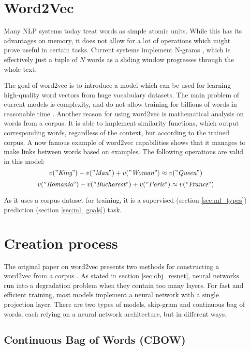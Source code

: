 \section{Word2Vec}
\label{sec:words_word2vec}

Many NLP systems today treat words as simple atomic units. While this has its advantages on memory, it does not allow for a lot of operations which might prove useful in certain tasks. Current systems implement N-grams \cite{word2vec}, which is effectively just a tuple of $N$ words as a sliding window progresses through the whole text.

The goal of word2vec is to introduce a model which can be used for learning high-quality word vectors from huge vocabulary datasets. The main problem of current models is complexity, and do not allow training for billions of words in reasonable time \cite{word2vec}. Another reason for using word2vec is mathematical analysis on words from a corpus. It is able to implement similarity functions, which output corresponding words, regardless of the context, but according to the trained corpus. A now famous example of word2vec capabilities shows that it manages to make links between words based on examples. The following operations are valid in this model:
$$ v("\textit{King}") - v("\textit{Man}") + v("\textit{Woman}") \approx v("\textit{Queen}") $$
$$ v("\textit{Romania}") - v("\textit{Bucharest}") + v("\textit{Paris}") \approx v("\textit{France}") $$

As it uses a corpus dataset for training, it is a supervised (section \ref{sec:ml_types}) prediction (section \ref{sec:ml_goals}) task.

\section{Creation process}
\label{sec:words_creation}

The original paper on word2vec presents two methods for constructing a word2vec from a corpus \cite{word2vec}. As stated in section \ref{sec:obj_resnet}, neural networks run into a degradation problem when they contain too many layers. For fast and efficient training, most models implement a neural network with a single projection layer. There are two types of models, skip-gram and continuous bag of words, each relying on a neural network architecture, but in different ways.

\subsection{Continuous Bag of Words (CBOW)}
\label{subsec:words_creation_cbow}

